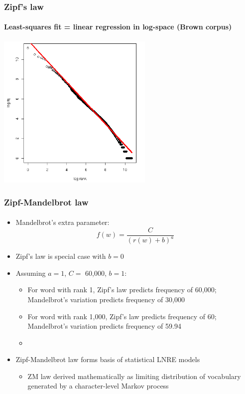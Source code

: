 \documentclass[t]{beamer} %
\begin{document}
\begin{frame}
  \frametitle{Zipf's law}
  \framesubtitle{Least-squares fit = linear regression in log-space (Brown corpus)}

  \ungap[1.5]
  \begin{center}
    \includegraphics[height=7.5cm]{img/brown-zipf-rf}
  \end{center}
\end{frame}

\begin{frame}
  \frametitle{Zipf-Mandelbrot law}
  \framesubtitle{\citet{Mandelbrot:53,Mandelbrot:62}}

  \begin{itemize}
    \item Mandelbrot's extra parameter:
    \[
    f(w)=\frac{C}{(r(w) + b)^a}
    \]
  \item Zipf's law is special case with $b=0$
  \item Assuming $a=1$, $C=$ 60,000, $b=1$:
    \begin{itemize}
    \item For word with rank 1, Zipf's law predicts frequency of
      60,000; Mandelbrot's variation predicts frequency of 30,000
    \item For word with rank 1,000,  Zipf's law predicts frequency of
      60; Mandelbrot's variation predicts frequency of 59.94
    \item[]
    \end{itemize}
  \item Zipf-Mandelbrot law forms basis of statistical LNRE models%
    \begin{itemize}
    \item ZM law derived mathematically as limiting distribution of
      vocabulary generated by a character-level Markov process
    \end{itemize}
  \end{itemize}
\end{frame}
\end{document}
